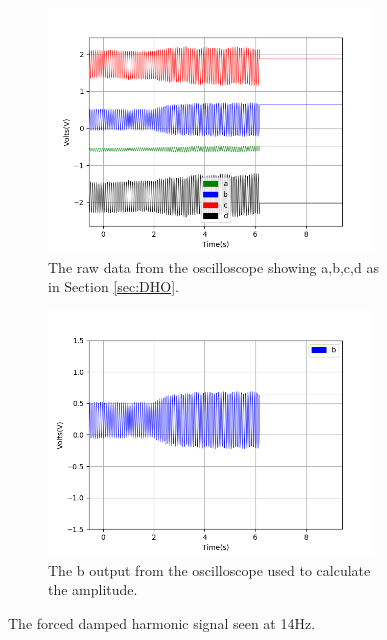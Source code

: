 \begin{figure}[h!]
\centering
\begin{subfigure}[t]{.475\textwidth}
  \centering
  \includegraphics[width=0.95\textwidth, height=0.20\textheight]{figures/FDHO/scope_41raw.png}
  \caption{The raw data from the oscilloscope showing a,b,c,d as in Section \ref{sec:DHO}.}
 \label{fig:FDHO_14Hz_raw}
\end{subfigure}\hfill
\begin{subfigure}[t]{.475\textwidth}
  \centering
  \includegraphics[width=0.95\textwidth, height=0.20\textheight]{figures/FDHO/scope_41v_2.png}
  \caption{The b output from the oscilloscope used to calculate the amplitude.}
\label{fig:FDHO_14Hz_b}
\end{subfigure}
\caption{The forced damped harmonic signal seen at 14Hz.}
\label{fig:FDHO_14Hz}
\end{figure}

